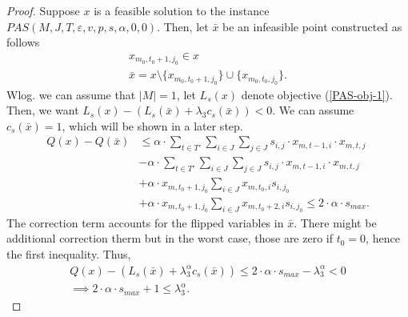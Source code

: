\documentclass[12pt]{article}
\begin{document}
\begin{proof}
Suppose $x$ is a feasible solution to the instance $PAS(M, J, T, \varepsilon, v, p, s, \alpha, 0, 0)$. 
Then, let $\bar{x}$ be an infeasible point constructed as follows
\begin{gather*}
x_{m_0, t_0 + 1,j_0} \in x \\
\bar{x} = x \setminus \{x_{m_0, t_0 + 1,j_0}\} \cup \{x_{m_0, t_0 ,j_0}\}.
\end{gather*}
Wlog. we can assume that $|M| = 1$, let $L_s(x)$ denote objective (\ref{PAS-obj-1}).
Then, we want $L_s(x) - (L_s(\bar{x}) + \lambda_3 c_s(\bar{x})) < 0$.
We can assume $c_s(\bar{x}) = 1$, which will be shown in a later step.
\begin{align*}
Q(x) - Q(\bar{x}) &\leq \alpha \cdot  \sum_{t \in T'} \sum_{i \in J}\sum_{j \in J} s_{i,j} \cdot x_{m, t-1, i} \cdot x_{m, t, j} \\ 
&- \alpha \cdot  \sum_{t \in T'} \sum_{i \in J}\sum_{j \in J} s_{i,j} \cdot x_{m, t-1, i} \cdot x_{m, t, j} \\
&+ \alpha  \cdot x_{m, t_0+1, j_0}\sum_{i \in J}  x_{m, t_0, i} s_{i, j_0}  \\
&+  \alpha \cdot x_{m, t_0+1, j_0}\sum_{i \in J}  x_{m, t_0+2, i} s_{i, j_0}
\leq 2 \cdot \alpha \cdot s_{max}.
\end{align*}
The correction term accounts for the flipped variables in $\bar{x}$. 
There might be additional correction therm but in the worst case, those are zero if $t_0 = 0$, hence the first inequality.
Thus, 
\begin{gather*}
Q(x) - (L_s(\bar{x}) + \lambda_3^{\alpha} c_s(\bar{x})) \leq 2 \cdot \alpha \cdot s_{max} - \lambda_3^{\alpha} < 0 \\
\implies 2 \cdot \alpha \cdot s_{max} + 1 \leq \lambda_3^{\alpha}.
\end{gather*}
\end{proof}
\end{document}
